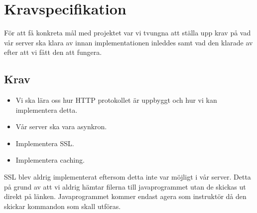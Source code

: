 \section{Kravspecifikation}
För att få konkreta mål med projektet var vi tvungna att ställa upp krav på vad vår server ska klara av innan implementationen inleddes samt vad den klarade av efter att vi fått den att fungera. 

\subsection{Krav}

\begin{itemize}

\item{Vi ska lära oss hur HTTP protokollet är uppbyggt och hur vi kan implementera detta.}
\item{Vår server ska vara asynkron.}
\item{Implementera SSL.}
\item{Implementera caching.}

\end{itemize}

SSL blev aldrig implementerat eftersom detta inte var möjligt i vår server. Detta på grund av att vi aldrig hämtar filerna till javaprogrammet utan de skickas ut direkt på länken. Javaprogrammet kommer endast agera som instruktör då den skickar kommandon som skall utföras. 